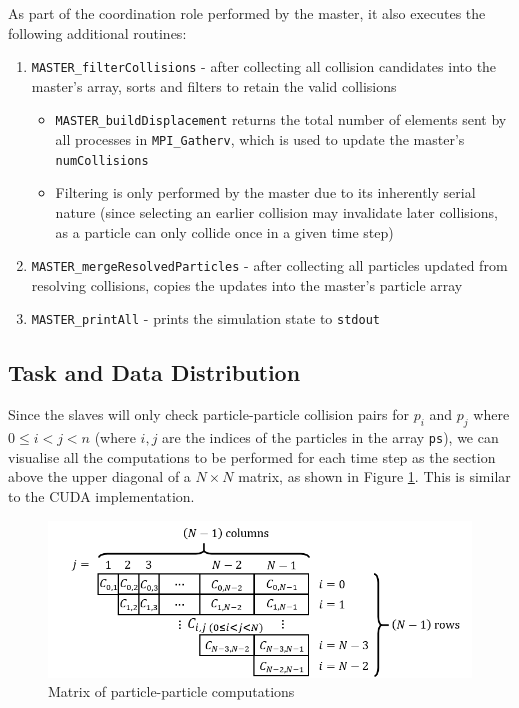 \documentclass[12pt]{article}
\begin{document}
As part of the coordination role performed by the master, it also executes the following additional routines:
\begin{enumerate}
    \item \texttt{MASTER\_filterCollisions} - after collecting all collision candidates into the master's array, sorts and filters to retain the valid collisions
    \begin{itemize}
        \item \texttt{MASTER\_buildDisplacement} returns the total number of elements sent by all processes in \texttt{MPI\_Gatherv}, which is used to update the master's \texttt{numCollisions}
        \item Filtering is only performed by the master due to its inherently serial nature (since selecting an earlier collision may invalidate later collisions, as a particle can only collide once in a given time step)
    \end{itemize}
    \item \texttt{MASTER\_mergeResolvedParticles} - after collecting all particles updated from resolving collisions, copies the updates into the master's particle array
    \item \texttt{MASTER\_printAll} - prints the simulation state to \texttt{stdout}
\end{enumerate}

\subsection{Task and Data Distribution}
\label{subsection:data-distribution}
Since the slaves will only check particle-particle collision pairs for $p_i$ and $p_j$ where $0 \leq i < j < n$ (where $i, j$ are the indices of the particles in the array \texttt{ps}), we can visualise all the computations to be performed for each time step as the section above the upper diagonal of a $N \times N$ matrix, as shown in Figure \ref{fig:collisionMatrix}. This is similar to the CUDA implementation.

\begin{figure}[H]
    \centering
    \includegraphics[width=1.0\textwidth]{reportAssets/chap3ppCollisionMatrix.png}
    \caption{Matrix of particle-particle computations}
    \label{fig:collisionMatrix}
\end{figure}
\end{document}
